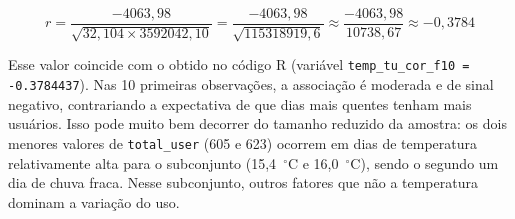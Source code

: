 \documentclass[10pt, a4paper]{article}
\begin{document}
\begin{table}[!htb]
\centering
\caption{Cálculo auxiliar da correlação -- 10 primeiras observações}
\label{tab:correlacao-10}
\end{table}

\[
r = \frac{-4063{,}98}{\sqrt{32{,}104 \times 3592042{,}10}} = \frac{-4063{,}98}{\sqrt{115318919{,}6}} \approx \frac{-4063{,}98}{10738{,}67} \approx -0{,}3784
\]

Esse valor coincide com o obtido no código R (variável \texttt{temp\_tu\_cor\_f10 = -0.3784437}). Nas 10 primeiras observações, a associação é moderada e de sinal negativo, contrariando a expectativa de que dias mais quentes tenham mais usuários. Isso pode muito bem decorrer do tamanho reduzido da amostra: os dois menores valores de \texttt{total\_user} (605 e 623) ocorrem em dias de temperatura relativamente alta para o subconjunto (15,4~$^\circ$C e 16,0~$^\circ$C), sendo o segundo um dia de chuva fraca. Nesse subconjunto, outros fatores que não a temperatura dominam a variação do uso.
\end{document}
